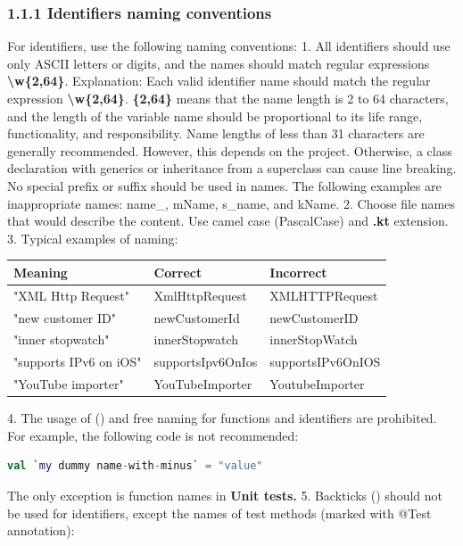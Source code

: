\subsubsection*{\textbf{1.1.1 Identifiers naming conventions}}
\leavevmode\newline
\label{sec:1.1.1}
For identifiers, use the following naming conventions:
1.	All identifiers should use only ASCII letters or digits, and the names should match regular expressions \textbf{\textbackslash w\{2,64\}}.
Explanation: Each valid identifier name should match the regular expression \textbf{\textbackslash w\{2,64\}}.
\textbf{\{2,64\}} means that the name length is 2 to 64 characters, and the length of the variable name should be proportional to its life range, functionality, and responsibility.
Name lengths of less than 31 characters are generally recommended. However, this depends on the project. Otherwise, a class declaration with generics or inheritance from a superclass can cause line breaking.
No special prefix or suffix should be used in names. The following examples are inappropriate names: name\_, mName, s\_name, and kName.
2.	Choose file names that would describe the content. Use camel case (PascalCase) and \textbf{.kt} extension.
3.	Typical examples of naming:
\begin{center}
\begin{tabular}{ |p{5.0cm}|p{5.0cm}|p{5.0cm}| }
\hline
Meaning&Correct&Incorrect\\
\hline
 "XML Http Request" & XmlHttpRequest & XMLHTTPRequest \\
 "new customer ID" & newCustomerId & newCustomerID \\
 "inner stopwatch" & innerStopwatch & innerStopWatch \\
 "supports IPv6 on iOS" & supportsIpv6OnIos & supportsIPv6OnIOS \\
 "YouTube importer" & YouTubeImporter & YoutubeImporter \\
\hline
\end{tabular}
\end{center}
4.	The usage of (\textbf{}) and free naming for functions and identifiers are prohibited. For example, the following code is not recommended:
\begin{lstlisting}[language=Kotlin]
val `my dummy name-with-minus` = "value"
\end{lstlisting}
The only exception is function names in \textbf{Unit tests.}
5.	Backticks (\textbf{}) should not be used for identifiers, except the names of test methods (marked with @Test annotation):
